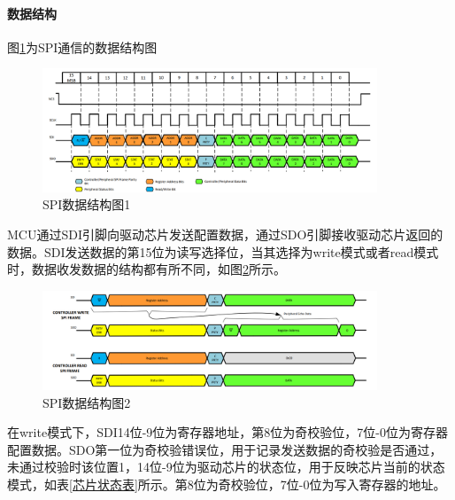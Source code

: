 \paragraph{数据结构}
图\ref{SPI数据结构图1}为SPI通信的数据结构图
\begin{figure}[ht]
	\centering
	\includegraphics[width=10cm]{figure/SPI Frame.png}
	\caption{SPI数据结构图1}
	\label{SPI数据结构图1}
\end{figure}
MCU通过SDI引脚向驱动芯片发送配置数据，通过SDO引脚接收驱动芯片返回的数据。SDI发送数据的第15位为读写选择位，当其选择为write模式或者read模式时，数据收发数据的结构都有所不同，如图\ref{SPI数据结构图2}所示。
\begin{figure}[ht]
	\centering
	\includegraphics[width=10cm]{figure/SPI Transfer Sequence.png}
	\caption{SPI数据结构图2}
	\label{SPI数据结构图2}
\end{figure}
在write模式下，SDI14位-9位为寄存器地址，第8位为奇校验位，7位-0位为寄存器配置数据。SDO第一位为奇校验错误位，用于记录发送数据的奇校验是否通过，未通过校验时该位置1，14位-9位为驱动芯片的状态位，用于反映芯片当前的状态模式，如表\ref{芯片状态表}所示。第8位为奇校验位，7位-0位为写入寄存器的地址。\par


